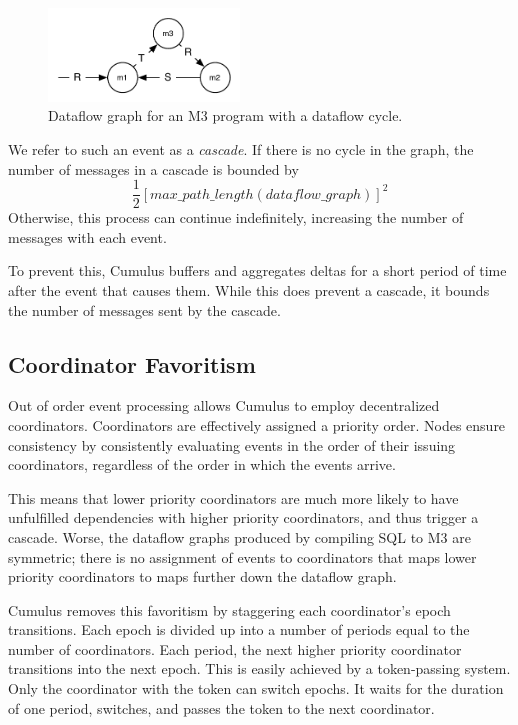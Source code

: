 \documentclass{vldb}
\begin{document}
\begin{figure}
\begin{center}
\includegraphics[width=2in]{graphics/cycle_graph}
\end{center}
\caption{Dataflow graph for an M3 program with a dataflow cycle.}
\label{fig:dataflowcycle}
\end{figure}

We refer to such an event as a \textit{cascade}.  If there is no cycle in the graph, the number of messages in a cascade is bounded by 
$$\frac 12 [max\_path\_length(dataflow\_graph)]^2$$
Otherwise, this process can continue indefinitely, increasing the number of messages with each event.  

To prevent this, Cumulus buffers and aggregates deltas for a short period of time after the event that causes them.  While this does prevent a cascade, it bounds the number of messages sent by the cascade.


\subsection{Coordinator Favoritism}

Out of order event processing allows Cumulus to employ decentralized coordinators.  Coordinators are effectively assigned a priority order.  Nodes ensure consistency by consistently evaluating events in the order of their issuing coordinators, regardless of the order in which the events arrive.

This means that lower priority coordinators are much more likely to have unfulfilled dependencies with higher priority coordinators, and thus trigger a cascade.  Worse, the dataflow graphs produced by compiling SQL to M3 are symmetric; there is no assignment of events to coordinators that maps lower priority coordinators to maps further down the dataflow graph.

Cumulus removes this favoritism by staggering each coordinator's epoch transitions.  Each epoch is divided up into a number of periods equal to the number of coordinators.  Each period, the next higher priority coordinator transitions into the next epoch.  This is easily achieved by a token-passing system.  Only the coordinator with the token can switch epochs.  It waits for the duration of one period, switches, and passes the token to the next coordinator.
\end{document}
